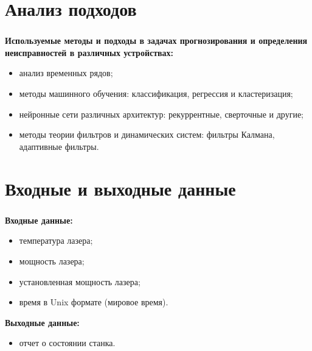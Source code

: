 
\section{Анализ подходов}

\begin{frame}
\frametitle{\insertsection}

\textbf{Используемые методы и подходы в задачах прогнозирования и определения неисправностей в  различных устройствах:}
\begin{itemize}
    \item анализ временных рядов;
    \item методы машинного обучения: классификация, регрессия и кластеризация;
    \item нейронные сети различных архитектур: рекуррентные, сверточные и другие;
    \item методы теории фильтров и динамических систем: фильтры Калмана, адаптивные фильтры.
\end{itemize}

\end{frame}



\section{Входные и выходные данные}

\begin{frame}
\frametitle{\insertsection}

\textbf{Входные данные:}
\begin{itemize}
    \item температура лазера;
    \item мощность лазера;
    \item установленная мощность лазера;
    \item время в Unix формате (мировое время).
\end{itemize}

\textbf{Выходные данные:}
\begin{itemize}
    \item отчет о состоянии станка.
\end{itemize}


\end{frame}



